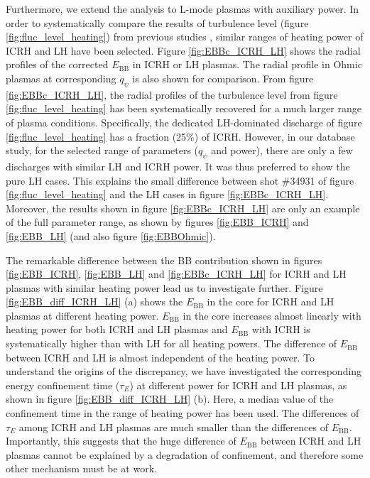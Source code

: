 Furthermore, we extend the analysis to L-mode plasmas with auxiliary power. In order to systematically compare the results of turbulence level (figure \ref{fig:fluc_level_heating}) from previous studies \cite{Guirlet_2010_NF}, similar ranges of heating power of ICRH and LH have been selected. Figure \ref{fig:EBBc_ICRH_LH} shows the radial profiles of the corrected $E_\mathrm{BB}$ in ICRH or LH plasmas. The radial profile in Ohmic plasmas at corresponding $q_{\psi}$ is also shown for comparison. From figure \ref{fig:EBBc_ICRH_LH}, the radial profiles of the turbulence level from figure \ref{fig:fluc_level_heating} has been systematically recovered for a much larger range of plasma conditions. Specifically, the dedicated LH-dominated discharge of figure \ref{fig:fluc_level_heating} has a fraction (25\%) of ICRH. However, in our database study, for the selected range of parameters ($q_{\psi}$ and power), there are only a few discharges with similar LH and ICRH power. It was thus preferred to show the pure LH cases. This explains the small difference between shot \#34931 of figure \ref{fig:fluc_level_heating} and the LH cases in figure \ref{fig:EBBc_ICRH_LH}. Moreover, the results shown in figure \ref{fig:EBBc_ICRH_LH} are only an example of the full parameter range, as shown by figures \ref{fig:EBB_ICRH} and \ref{fig:EBB_LH} (and also figure \ref{fig:EBBOhmic}).


The remarkable difference between the BB contribution shown in figures \ref{fig:EBB_ICRH}, \ref{fig:EBB_LH} and \ref{fig:EBBc_ICRH_LH} for ICRH and LH plasmas with similar heating power lead us to investigate further. Figure \ref{fig:EBB_diff_ICRH_LH} (a) shows the $E_\mathrm{BB}$ in the core for ICRH and LH plasmas at different heating power. $E_\mathrm{BB}$ in the core increases almost linearly with heating power for both ICRH and LH plasmas and $E_\mathrm{BB}$ with ICRH is systematically higher than with LH for all heating powers. The difference of $E_\mathrm{BB}$ between ICRH and LH is almost independent of the heating power. To understand the origins of the discrepancy, we have investigated the corresponding energy confinement time ($\tau_{E}$) at different power for ICRH and LH plasmas, as shown in figure \ref{fig:EBB_diff_ICRH_LH} (b). Here, a median value of the confinement time in the range of heating power has been used. The differences of $\tau_{E}$ among ICRH and LH plasmas are much smaller than the differences of $E_\mathrm{BB}$. Importantly, this suggests that the huge difference of $E_\mathrm{BB}$ between ICRH and LH plasmas cannot be explained by a degradation of confinement, and therefore some other mechanism must be at work.


